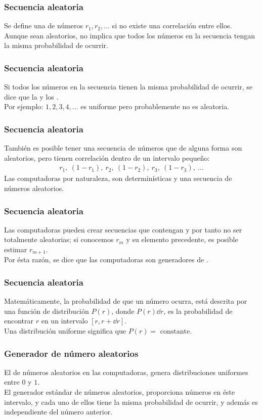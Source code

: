 \documentclass[12pt]{beamer}
\begin{document}
\begin{frame}
\frametitle{Secuencia aleatoria}
Se define una  de números $r_{1}, r_{2}, \ldots$ si no existe una correlación entre ellos.
\\
\bigskip
\pause
Aunque sean aleatorios, no implica que todos los números en la secuencia tengan la misma probabilidad de ocurrir.
\end{frame}
\begin{frame}
\frametitle{Secuencia aleatoria}
Si todos los números en la secuencia tienen la misma probabilidad de ocurrir, se dice que la  y los .
\\
\bigskip
\pause 
Por ejemplo: $1, 2, 3, 4, \ldots$ es uniforme pero probablemente no es aleatoria.
\end{frame}
\begin{frame}
\frametitle{Secuencia aleatoria}
También es posible tener una secuencia de números que de alguna forma son aleatorios, pero tienen correlación dentro de un intervalo pequeño:
\pause
\begin{align*}
r_{1},  \: (1 - r_{1} ), \: r_{2}, \: (1 - r_{2} ), \: r_{3}, \: (1 - r_{3} ), \: \ldots
\end{align*}
Las computadoras por naturaleza, son determinísticas y  una secuencia de números aleatorios.
\end{frame}
\begin{frame}
\frametitle{Secuencia aleatoria}
Las computadoras pueden crear secuencias que contengan  y por tanto no ser totalmente aleatorias; si conocemos $r_{m}$ y su elemento precedente, es posible estimar $r_{m+1}$.
\\
\bigskip
\pause
Por ésta razón, se dice que las computadoras son generadores de .
\end{frame}
\begin{frame}
\frametitle{Secuencia aleatoria}
Matemáticamente, la probabilidad de que un número ocurra, está descrita por una función de distribución $P(r)$, \pause donde $P (r) \dd{r}$, es la probabilidad de encontrar $r$ en un intervalo $[r, r + \dd{r}]$.
\\
\bigskip
\pause
Una distribución uniforme significa que $P (r) = \mbox{ constante}$.
\end{frame}
\begin{frame}
\frametitle{Generador de número aleatorios}
El  de números aleatorios en las computadoras, genera distribuciones uniformes entre $0$ y $1$.
\\
\bigskip
\pause 
El generador estándar de números aleatorios, proporciona números en éste intervalo, y cada uno de ellos tiene la misma probabilidad de ocurrir, y además es independiente del número anterior.
\end{frame}
\end{document}
